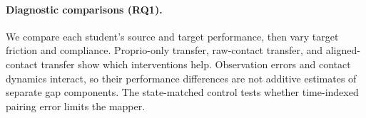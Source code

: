 \paragraph{Diagnostic comparisons (RQ1).}
We compare each student's source and target performance, then vary target friction and compliance. Proprio-only transfer, raw-contact transfer, and aligned-contact transfer show which interventions help. Observation errors and contact dynamics interact, so their performance differences are not additive estimates of separate gap components. The state-matched control tests whether time-indexed pairing error limits the mapper.

\FloatBarrier

